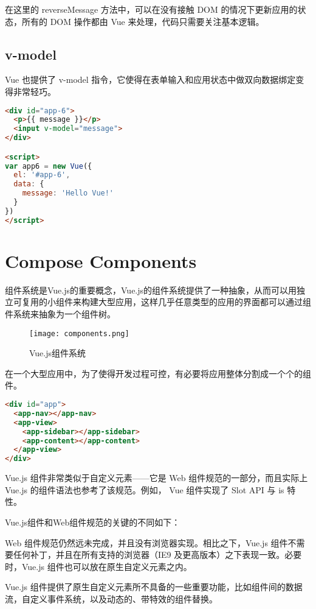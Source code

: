 在这里的 reverseMessage 方法中，可以在没有接触 DOM 的情况下更新应用的状态，所有的 DOM 操作都由 Vue 来处理，代码只需要关注基本逻辑。


\subsection{v-model}


Vue 也提供了 v-model 指令，它使得在表单输入和应用状态中做双向数据绑定变得非常轻巧。




\begin{lstlisting}[language=HTML]
<div id="app-6">
  <p>{{ message }}</p>
  <input v-model="message">
</div>

<script>
var app6 = new Vue({
  el: '#app-6',
  data: {
    message: 'Hello Vue!'
  }
})
</script>
\end{lstlisting}


\section{Compose Components}


组件系统是Vue.js的重要概念，Vue.js的组件系统提供了一种抽象，从而可以用独立可复用的小组件来构建大型应用，这样几乎任意类型的应用的界面都可以通过组件系统来抽象为一个组件树。


\begin{figure}[htbp]
\centering
\texttt{[image: components.png]}
\caption{Vue.js组件系统}
\end{figure}

在一个大型应用中，为了使得开发过程可控，有必要将应用整体分割成一个个的组件。

\begin{lstlisting}[language=HTML]
<div id="app">
  <app-nav></app-nav>
  <app-view>
    <app-sidebar></app-sidebar>
    <app-content></app-content>
  </app-view>
</div>
\end{lstlisting}


Vue.js 组件非常类似于自定义元素——它是 Web 组件规范的一部分，而且实际上 Vue.js 的组件语法也参考了该规范。例如， Vue 组件实现了 Slot API 与 is 特性。

Vue.js组件和Web组件规范的关键的不同如下：

\begin{compactenum}
\item Web 组件规范仍然远未完成，并且没有浏览器实现。相比之下，Vue.js 组件不需要任何补丁，并且在所有支持的浏览器（IE9 及更高版本）之下表现一致。必要时，Vue.js 组件也可以放在原生自定义元素之内。
\item Vue.js 组件提供了原生自定义元素所不具备的一些重要功能，比如组件间的数据流，自定义事件系统，以及动态的、带特效的组件替换。
\end{compactenum}


